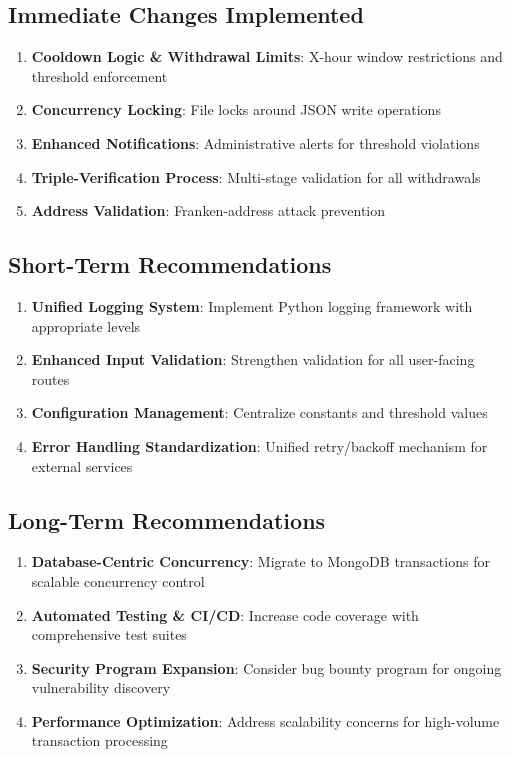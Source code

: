 \documentclass[11pt,a4paper]{article}
\begin{document}
\subsection{Immediate Changes Implemented}
\begin{enumerate}
    \item \textbf{Cooldown Logic \& Withdrawal Limits}: X-hour window restrictions and threshold enforcement
    \item \textbf{Concurrency Locking}: File locks around JSON write operations
    \item \textbf{Enhanced Notifications}: Administrative alerts for threshold violations
    \item \textbf{Triple-Verification Process}: Multi-stage validation for all withdrawals
    \item \textbf{Address Validation}: Franken-address attack prevention
\end{enumerate}

\subsection{Short-Term Recommendations}
\begin{enumerate}
    \item \textbf{Unified Logging System}: Implement Python logging framework with appropriate levels
    \item \textbf{Enhanced Input Validation}: Strengthen validation for all user-facing routes
    \item \textbf{Configuration Management}: Centralize constants and threshold values
    \item \textbf{Error Handling Standardization}: Unified retry/backoff mechanism for external services
\end{enumerate}

\subsection{Long-Term Recommendations}
\begin{enumerate}
    \item \textbf{Database-Centric Concurrency}: Migrate to MongoDB transactions for scalable concurrency control
    \item \textbf{Automated Testing \& CI/CD}: Increase code coverage with comprehensive test suites
    \item \textbf{Security Program Expansion}: Consider bug bounty program for ongoing vulnerability discovery
    \item \textbf{Performance Optimization}: Address scalability concerns for high-volume transaction processing
\end{enumerate}
\end{document}
